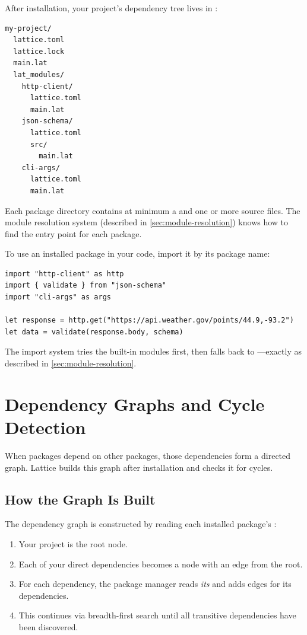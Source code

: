 After installation, your project's dependency tree lives in :

\begin{lstlisting}[language=bash, numbers=none]
my-project/
  lattice.toml
  lattice.lock
  main.lat
  lat_modules/
    http-client/
      lattice.toml
      main.lat
    json-schema/
      lattice.toml
      src/
        main.lat
    cli-args/
      lattice.toml
      main.lat
\end{lstlisting}

Each package directory contains at minimum a  and one or more  source files.
The module resolution system (described in \cref{sec:module-resolution}) knows how to find the entry point for each package.

To use an installed package in your code, import it by its package name:

\begin{lstlisting}[language=Lattice, caption={Importing installed packages}]
import "http-client" as http
import { validate } from "json-schema"
import "cli-args" as args

let response = http.get("https://api.weather.gov/points/44.9,-93.2")
let data = validate(response.body, schema)
\end{lstlisting}

The import system tries the built-in modules first, then falls back to ---exactly as described in \cref{sec:module-resolution}.

\section{Dependency Graphs and Cycle Detection}\label{sec:dep-graph}

When packages depend on other packages, those dependencies form a directed graph.
Lattice builds this graph after installation and checks it for cycles.

\subsection{How the Graph Is Built}\label{subsec:graph-construction}

The dependency graph is constructed by reading each installed package's :

\begin{enumerate}
  \item Your project is the root node.
  \item Each of your direct dependencies becomes a node with an edge from the root.
  \item For each dependency, the package manager reads \emph{its}  and adds edges for its dependencies.
  \item This continues via breadth-first search until all transitive dependencies have been discovered.
\end{enumerate}

